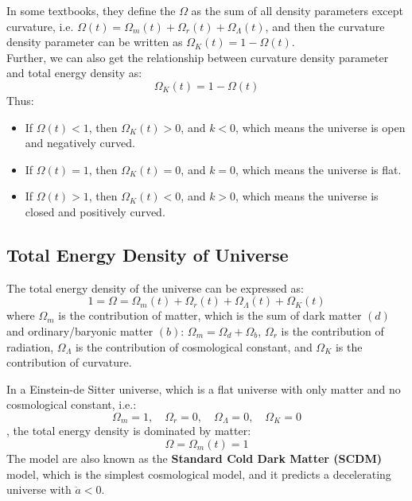 \bigskip \noindent
\begin{remark}
    In some textbooks, they define the $\Omega$ as the sum of all density parameters except curvature, i.e. $\Omega(t) = \Omega_{m}(t) + \Omega_{r}(t) + \Omega_{\Lambda}(t)$, and then the curvature density parameter can be written as $\Omega_K(t) = 1 - \Omega(t)$. \\

    Further, we can also get the relationship between curvature density parameter and total energy density as:
    \[
        \Omega_K(t) = 1 - \Omega(t)
    \]
    Thus:
    \begin{itemize}
        \item If $\Omega(t) < 1$, then $\Omega_K(t) > 0$, and $k < 0$, which means the universe is open and negatively curved. \\
        \item If $\Omega(t) = 1$, then $\Omega_K(t) = 0$, and $k = 0$, which means the universe is flat. \\
        \item If $\Omega(t) > 1$, then $\Omega_K(t) < 0$, and $k > 0$, which means the universe is closed and positively curved. \\
    \end{itemize}
\end{remark}
\bigskip \noindent \bigskip \noindent \bigskip \noindent
\subsection{Total Energy Density of Universe}
\begin{theory}
    The total energy density of the universe can be expressed as:
    \[
        1 = \Omega = \Omega_{m}(t) + \Omega_{r}(t) + \Omega_{\Lambda}(t) + \Omega_{K}(t)
    \]
    where $\Omega_{m}$ is the contribution of matter, which is the sum of dark matter $(d)$ and ordinary/baryonic matter $(b)$: $\Omega_{m} = \Omega_{d} + \Omega_{b}$, $\Omega_{r}$ is the contribution of radiation, $\Omega_{\Lambda}$ is the contribution of cosmological constant, and $\Omega_{K}$ is the contribution of curvature. \\
\end{theory}

\bigskip \noindent
\begin{theory}
    In a Einstein-de Sitter universe, which is a flat universe with only matter and no cosmological constant, i.e.:
    \[
        \Omega_{m} = 1, \quad \Omega_{r} = 0, \quad \Omega_{\Lambda} = 0, \quad \Omega_{K} = 0
    \]
    , the total energy density is dominated by matter:
    \[
        \Omega = \Omega_{m}(t) = 1
    \]
    The model are also known as the \textbf{Standard Cold Dark Matter (SCDM)} model, which is the simplest cosmological model, and it predicts a decelerating universe with $\ddot{a} < 0$. 
\end{theory}

